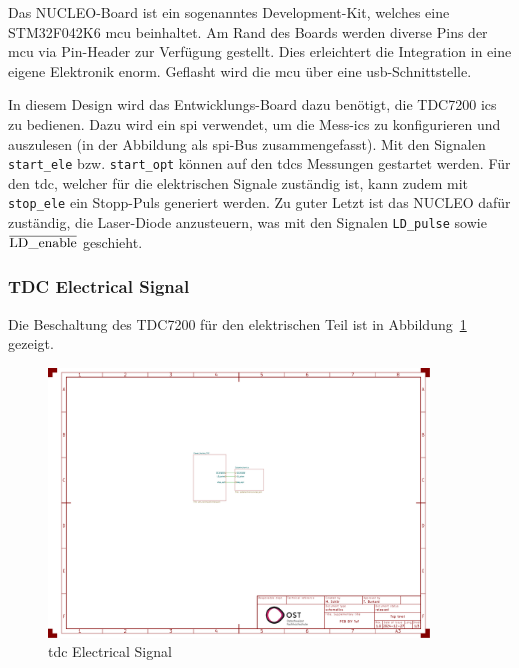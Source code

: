 Das NUCLEO-Board ist ein sogenanntes \dq Development-Kit\dq, welches eine STM32F042K6 \acrshort{mcu}
beinhaltet. Am Rand des Boards werden diverse Pins der \acrfull{mcu} via Pin-Header zur Verfügung gestellt. Dies erleichtert
die Integration in eine eigene Elektronik enorm. Geflasht wird die \acrshort{mcu} über eine \acrshort{usb}-Schnittstelle.

In diesem Design wird das Entwicklungs-Board dazu benötigt, die TDC7200 \acrshort{ic}s zu bedienen. Dazu wird ein \acrfull{spi}
verwendet, um die Mess-\acrshort{ic}s zu konfigurieren und auszulesen (in der Abbildung als \acrshort{spi}-Bus zusammengefasst).
Mit den Signalen \lstinline|start_ele| bzw. \lstinline|start_opt| können auf den \acrshort{tdc}s Messungen gestartet
werden. Für den \acrshort{tdc}, welcher für die elektrischen Signale zuständig ist, kann zudem mit \lstinline|stop_ele|
ein Stopp-Puls generiert werden. Zu guter Letzt ist das NUCLEO dafür zuständig, die Laser-Diode anzusteuern, was mit den
Signalen \lstinline|LD_pulse| sowie $\overline{\mbox{\lstinline|LD_enable|}}$ geschieht.

\subsubsection{TDC Electrical Signal}

Die Beschaltung des TDC7200 \cite{ti2016tdc7200_datasheet} für den elektrischen Teil ist in
Abbildung~\ref{fig:tdc_ele_signal} gezeigt.

\begin{figure}[H]
    \centering
    \includegraphics[page=2, trim=80 330 750 310, clip, width=0.9\textwidth]{attachments/schematic.pdf}
    \caption{\acrshort{tdc} Electrical Signal}\label{fig:tdc_ele_signal}
\end{figure}

